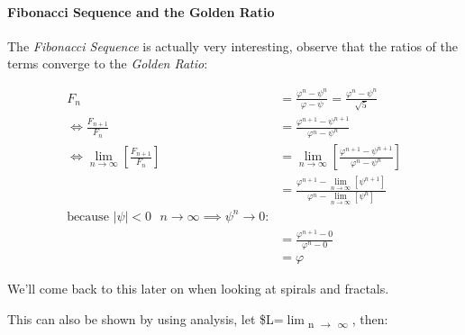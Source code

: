\documentclass[11pt]{article}
\begin{document}
\paragraph{Fibonacci Sequence and the Golden Ratio}
\label{fib-golden-ratio-proof}
The \emph{Fibonacci Sequence} is actually very interesting, observe that the ratios of the terms converge to the \emph{Golden Ratio}:

\begin{align*}
    F_n &= \frac{\varphi^n-\psi^n}{\varphi-\psi} = \frac{\varphi^n-\psi^n}{\sqrt 5} \\
    \iff \frac{F_{n+1}}{F_n}	&= \frac{\varphi^{n+ 1} - \psi^{n+  1}}{\varphi^{n} - \psi^{n}} \\
    \iff \lim_{n \rightarrow \infty}\left[ \frac{F_{n+1}}{F_n} \right]	&= \lim_{n \rightarrow \infty}\left[ \frac{\varphi^{n+ 1} - \psi^{n+  1}}{\varphi^{n} - \psi^{n}} \right] \\
&= \frac{\varphi^{n+ 1} -\lim_{n \rightarrow \infty}\left[ \psi^{n +  1} \right] }{\varphi^{n} - \lim_{n \rightarrow \infty}\left[ \psi^n \right] } \\
\text{because $\mid \psi \mid < 0$ $n \rightarrow \infty \implies \psi^{n} \rightarrow 0$:} \\
&= \frac{\varphi^{n+  1} -  0}{\varphi^{n} -  0} \\
&= \varphi
\end{align*}

We'll come back to this later on when looking at spirals and fractals.

This can also be shown by using analysis, let \$L=\(\lim\)\textsubscript{n \(\rightarrow\) \(\infty\)} , then:
\end{document}
